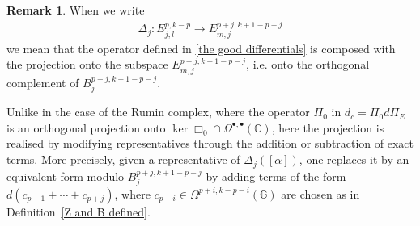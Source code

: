 \documentclass[dvipsnames]{amsart}
\theoremstyle{definition}
\newtheorem{remark}[theorem]{Remark}
\theoremstyle{definition}
\numberwithin{equation}{section}
\begin{document}
    \begin{remark}\label{remark: projection with exact forms} When we write
    \begin{align*}
        \Delta_j\colon E_{j,l}^{p,k-p}\longrightarrow E_{m,j}^{p+j,k+1-p-j}
    \end{align*}
we mean that the operator defined in \eqref{the good differentials} is composed with the projection onto the subspace $E_{m,j}^{p+j,k+1-p-j}$, i.e. onto the orthogonal complement of $B_j^{p+j,k+1-p-j}$.

Unlike in the case of the Rumin complex, where the operator $\Pi_0$ in $d_c=\Pi_0 d \Pi_E$ is an orthogonal projection onto $\ker \Box_0 \cap \Omega^{\bullet,\bullet}(\mathbb{G})$, here the projection is realised by modifying representatives through the addition or subtraction of exact terms. More precisely, given a representative of $\Delta_j([\alpha])$, one replaces it by an equivalent form modulo $B_j^{p+j,k+1-p-j}$ by adding terms of the form
$d(c_{p+1} + \cdots + c_{p+j})$,
where $c_{p+i} \in \Omega^{p+i,k-p-i}(\mathbb{G})$ are chosen as in Definition~\ref{Z and B defined}.
        
    \end{remark}
    
\end{document}
